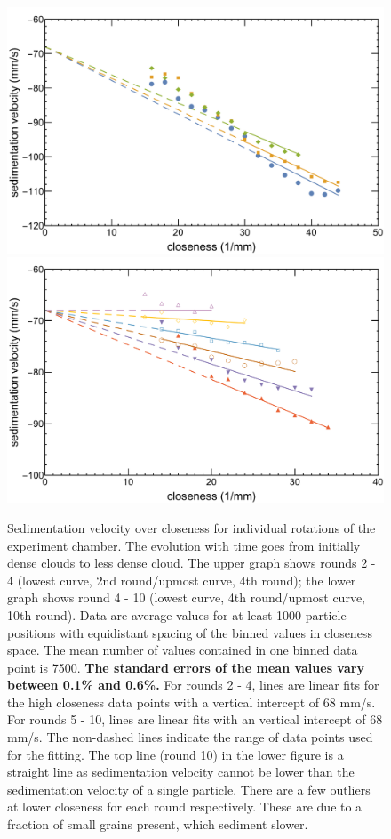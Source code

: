 \begin{figure}[h]
\includegraphics[width=\columnwidth]{Runde_1-3_mit_angepassten_Fits_II.pdf}
\includegraphics[width=\columnwidth]{Runde_4-9_IV.pdf}
    \caption{\label{fig.vvonc} Sedimentation velocity over closeness for individual rotations of the experiment chamber. The evolution with time goes from initially dense clouds { to less dense cloud. The upper graph shows rounds 2 - 4 (lowest curve, 2nd round/upmost curve, 4th round); the lower graph shows round 4 - 10 (lowest curve, 4th round/upmost curve, 10th round)}. Data are average values for at least 1000 particle positions {with equidistant spacing of the binned values in closeness space}. The mean number of values contained in one binned data point is 7500. \textbf{The standard errors of the mean values vary between 0.1\% and 0.6\%.}
	{For rounds 2 - 4, lines are linear fits for the high closeness data points with a vertical intercept of 68 mm/s. For rounds 5 - 10, lines are linear fits with an vertical intercept of 68 mm/s. The non-dashed lines indicate the range of data points used for the fitting. The top line (round 10) in the lower figure is a straight line as sedimentation velocity cannot be lower than the sedimentation velocity of a single particle. There are a few outliers at lower closeness for each round respectively. These are due to a fraction of small grains present, which sediment slower.}
    }
\end{figure}

